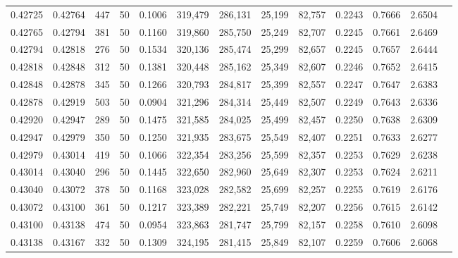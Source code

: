 \begin{tabular}{rrrrrrrrrrrrr}
0.42725 & 0.42764 &   447 &  50 &                                     0.1006 & 319,479 & 286,131 &  25,199 &  82,757 & 0.2243 & 0.7666 & 2.6504 \\
0.42765 & 0.42794 &   381 &  50 &                                     0.1160 & 319,860 & 285,750 &  25,249 &  82,707 & 0.2245 & 0.7661 & 2.6469 \\
0.42794 & 0.42818 &   276 &  50 &                                     0.1534 & 320,136 & 285,474 &  25,299 &  82,657 & 0.2245 & 0.7657 & 2.6444 \\
0.42818 & 0.42848 &   312 &  50 &                                     0.1381 & 320,448 & 285,162 &  25,349 &  82,607 & 0.2246 & 0.7652 & 2.6415 \\
0.42848 & 0.42878 &   345 &  50 &                                     0.1266 & 320,793 & 284,817 &  25,399 &  82,557 & 0.2247 & 0.7647 & 2.6383 \\
0.42878 & 0.42919 &   503 &  50 &                                     0.0904 & 321,296 & 284,314 &  25,449 &  82,507 & 0.2249 & 0.7643 & 2.6336 \\
0.42920 & 0.42947 &   289 &  50 &                                     0.1475 & 321,585 & 284,025 &  25,499 &  82,457 & 0.2250 & 0.7638 & 2.6309 \\
0.42947 & 0.42979 &   350 &  50 &                                     0.1250 & 321,935 & 283,675 &  25,549 &  82,407 & 0.2251 & 0.7633 & 2.6277 \\
0.42979 & 0.43014 &   419 &  50 &                                     0.1066 & 322,354 & 283,256 &  25,599 &  82,357 & 0.2253 & 0.7629 & 2.6238 \\
0.43014 & 0.43040 &   296 &  50 &                                     0.1445 & 322,650 & 282,960 &  25,649 &  82,307 & 0.2253 & 0.7624 & 2.6211 \\
0.43040 & 0.43072 &   378 &  50 &                                     0.1168 & 323,028 & 282,582 &  25,699 &  82,257 & 0.2255 & 0.7619 & 2.6176 \\
0.43072 & 0.43100 &   361 &  50 &                                     0.1217 & 323,389 & 282,221 &  25,749 &  82,207 & 0.2256 & 0.7615 & 2.6142 \\
0.43100 & 0.43138 &   474 &  50 &                                     0.0954 & 323,863 & 281,747 &  25,799 &  82,157 & 0.2258 & 0.7610 & 2.6098 \\
0.43138 & 0.43167 &   332 &  50 &                                     0.1309 & 324,195 & 281,415 &  25,849 &  82,107 & 0.2259 & 0.7606 & 2.6068 \\

\end{tabular}

